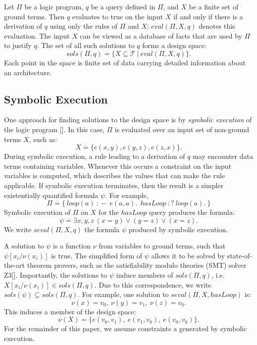 \documentclass[conference]{IEEEtran}
\newcommand{\seval}[3]{\mathit{seval}(#1,#2,#3)}
\newcommand{\DefinedToBe}{\stackrel{\mathit{\cdot}}{=}}
\newcommand{\tclear}{\mathcal{T}}
\newcommand{\sols}[1]{\mathit{sols}(#1)}
\begin{document}
Let $\Pi$ be a logic program, $q$ be a query defined in $\Pi$, and $X$ be a finite set of ground terms. Then $q$ evaluates to true on the input $X$ if and only if there is a derivation of $q$ using only the rules of $\Pi$ and $X$; $eval(\Pi,X,q)$ denotes this evaluation. The input $X$ can be viewed as a database of facts that are used by $\Pi$ to justify $q$. The set of all such solutions to $q$ forms a design space:
\begin{equation}
\sols{\Pi,q} \DefinedToBe \{ X \subseteq \tclear \ | \ eval(\Pi,X,q) \}.
\end{equation}   
Each point in the space is finite set of data carrying detailed information about an architecture. 

\subsection{Symbolic Execution}
One approach for finding solutions to the design space is by \textit{symbolic execution} of the logic program []. In this case, $\Pi$ is evaluated over an input set of non-ground terms $X$, such as:
\begin{equation}
X \DefinedToBe \{ e(x,y), e(y,z), e(z,x) \}.
\label{ex:3cycle}
\end{equation}
During symbolic execution, a rule leading to a derivation of $q$ may encounter data terms containing variables. Whenever this occurs a constraint on the input variables is computed, which describes the values that can make the rule applicable. If symbolic execution terminates, then the result is a simpler existentially quantified formula $\psi$. For example,
\begin{displaymath}
\Pi \DefinedToBe \{ \ loop(a) \ :\!- \ e(a,a). \  \ hasLoop \ :? \ loop(a). \ \}
\end{displaymath}
Symbolic execution of $\Pi$ on $X$ for the $hasLoop$ query produces the formula:
\begin{displaymath}
\psi \DefinedToBe \exists x,y,z \ (x = y) \vee (y = z) \vee (x = z).
\end{displaymath}
We write $\seval{\Pi}{X}{q}$ the formula $\psi$ produced by symbolic execution.

A solution to $\psi$ is a function $\nu$ from variables to ground terms, such that $\psi[x_i/\nu(x_i)]$ is true. The simplified form of $\psi$ allows it to be solved by state-of-the-art theorem provers, such as the satisfiability modulo theories (SMT) solver Z3[]. Importantly, the solutions to $\psi$ induce members of $\sols{\Pi,q}$, i.e. $X[x_i/\nu(x_i)] \in \sols{\Pi,q}$. Due to this correspondence, we write $\sols{\psi} \subseteq \sols{\Pi,q}$.
For example, one solution to $\seval{\Pi}{X}{hasLoop}$ is:
\begin{displaymath}
\nu(x) = v_0, \ \nu(y) = v_1, \ \nu(z) = v_0.
\end{displaymath}
This induces a member of the design space:
\begin{displaymath}
\nu(X) = \{ e(v_0,v_1), \ e(v_1,v_0), \ e(v_0,v_0) \}.
\end{displaymath}
For the remainder of this paper, we assume constraints a generated by symbolic execution.
\end{document}
